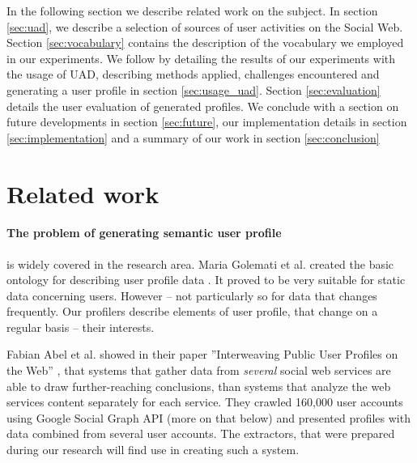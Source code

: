 In the following section we describe related work on the subject. In section \ref{sec:uad}, we describe
a selection of sources of user activities on the Social Web. Section \ref{sec:vocabulary} contains the description of
the vocabulary we employed in our experiments. We follow by detailing the results of our experiments
with the usage of UAD, describing methods applied, challenges encountered and generating a user profile in
section \ref{sec:usage_uad}. Section \ref{sec:evaluation} details the user evaluation of generated profiles.
We conclude with a section on future developments in section \ref{sec:future}, our implementation details
in section \ref{sec:implementation} and a summary of our work in section \ref{sec:conclusion}

\section{Related work}

\paragraph{The problem of generating semantic user profile} is widely covered in the
research area. Maria Golemati et al. created the basic ontology for describing
user profile data \cite{creating-ontology-for-user-profile}. It proved to be
very suitable for static data concerning users. However -- not particularly
so for data that changes frequently. Our profilers describe elements of user
profile, that change on a regular basis -- their interests.  

Fabian Abel et al. showed in their
paper ''Interweaving Public User Profiles on the Web'' \cite{public-profiles},
that systems that gather data from \textit{several} social web services are
able to draw further-reaching conclusions, than systems that analyze the web
services content separately for each service. They crawled 160,000 user
accounts using Google Social Graph API (more on that below) and presented
profiles with data combined from several user accounts.  The extractors, that
were prepared during our research will find use in creating such a system.

